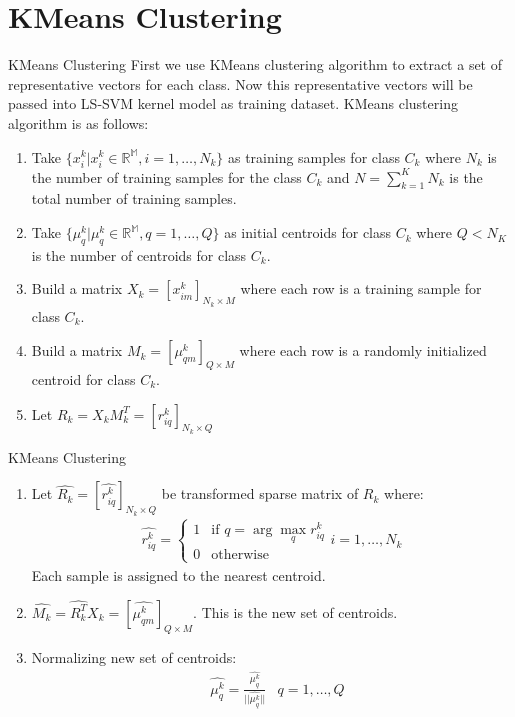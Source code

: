 \documentclass{beamer}
\newcounter{saveenumi}
\newcommand{\seti}{\setcounter{saveenumi}{\value{enumi}}}
\newcommand{\conti}{\setcounter{enumi}{\value{saveenumi}}}
\begin{document}
    \section{KMeans Clustering}
    \begin{frame}{KMeans Clustering}
        First we use KMeans clustering algorithm to extract a set of representative vectors for each class.
        Now this representative vectors will be passed into LS-SVM kernel model as training dataset.
        KMeans clustering algorithm is as follows:
        \begin{enumerate}
            \item Take $\{x_{i}^{k}|x_{i}^{k} \in \mathbb{R^{M}}, i=1,\ldots,N_{k}\}$ as training samples for class $C_{k}$ where
            $N_{k}$ is the number of training samples for the class $C_{k}$ and $N = \sum_{k=1}^{K}N_{k}$ is the total
            number of training samples.
            \item Take $\{\mu_{q}^{k}|\mu_{q}^{k} \in \mathbb{R^{M}}, q=1,\ldots,Q \}$ as initial centroids
            for class $C_{k}$ where $Q<N_{K}$ is the number of centroids for class $C_{k}$.
            \item Build a matrix $X_{k} = [x_{im}^{k}]_{N_{k} \times M}$ where each row is a training sample for class $C_{k}$.
            \item Build a matrix $M_{k} = [\mu_{qm}^{k}]_{Q \times M}$ where each row is a randomly initialized centroid
            for class $C_{k}$.
            \item Let $R_{k} = X_{k}M_{k}^{T} = [r_{iq}^{k}]_{N_{k}\times Q}$
            \seti
        \end{enumerate}
    \end{frame}
    \begin{frame}{KMeans Clustering}
        \begin{enumerate}
            \conti
            \item Let $\hat{R_{k}} = [\hat{r_{iq}^{k}}]_{N_{k}\times Q}$ be transformed sparse matrix of $R_{k}$ where:
            \begin{align*}
                \hat{r_{iq}^{k}} = \begin{cases}
                                       1 & \text{if } q = \arg \max_{q}r_{iq}^{k} \\
                                       0 & \text{otherwise}
                \end{cases}
                i = 1,\ldots,N_{k}
            \end{align*}
            Each sample is assigned to the nearest centroid.
            \item $\hat{M_{k}} = \hat{R_{k}^{T}}X_{k} = [\hat{\mu_{qm}^{k}}]_{Q \times M}$. This is the new set of centroids.
            \item Normalizing new set of centroids:
            \begin{align*}
                & \hat{\mu_{q}^{k}} = \frac{\hat{\mu_{q}^{k}}}{|| \hat{\mu_{q}^{k}} ||}
                & q=1,\ldots,Q
            \end{align*}
            \seti
        \end{enumerate}
    \end{frame}
\end{document}

